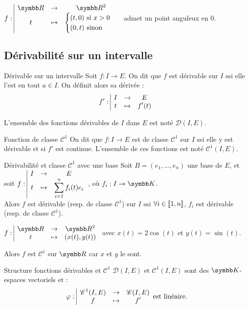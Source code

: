 \begin{exemple}
    $\fonction f \R {\R^2} t {\begin{cases} (t, 0)~\text{si}~x > 0\\(0,t)~\text{sinon}\end{cases}}$ admet un point anguleux en $0$.
\end{exemple}

\subsection{Dérivabilité sur un intervalle}

\begin{definition}{Dérivable sur un intervalle}{}
    Soit $f : I \to E$. On dit que $f$ est dérivable sur $I$ ssi elle l'est en tout $a \in I$. 
    On définit alors sa dérivée :
    \[f': \space \begin{array}{|ccc} \displaystyle I & \to & \displaystyle E \\ \displaystyle t & \mapsto & \displaystyle f'(t) \end{array}\] 

    L'ensemble des fonctions dérivables de $I$ dans $E$ est noté $\mathscr D(I, E)$.
\end{definition}

\begin{definition}{Fonction de classe $\mathscr C^1$}{}
    On dit que $f : I \to E$ est de classe $\mathscr C^1$ sur $I$ ssi 
    elle y est dérivable et si $f'$ est continue.
    L'ensemble de ces fonctions est noté $\mathscr C^1(I, E)$.
\end{definition}

\begin{proposition}{Dérivabilité et classe $\mathscr C^1$ avec une base }{}
    Soit $B = (e_1, \ldots, e_n)$ une base de $E$, et soit
    $\displaystyle f: \space \begin{array}{|ccc} \displaystyle I & \to & \displaystyle E \\ \displaystyle t & \mapsto & \displaystyle \sum_{i=1}^n f_i(t)e_i \end{array}$, où $f_i : I \to \K$. \\

    Alors $f$ est dérivable (resp. de classe $\mathscr C^1$) sur $I$ ssi
    $\forall i \in [\![1, n]\!]$, $f_i$ est dérivable (resp. de classe $\mathscr C^1$).
\end{proposition}

\begin{exemple}
    $\fonction{f}{\R}{\R^2}{t}{(x(t), y(t))}$ avec $x(t) = 2 \cos(t)$ et $y(t) = \sin(t)$.

    Alors $f$ est $\mathscr C^1$ sur $\R$ car $x$ et $y$ le sont.
\end{exemple}


\begin{proposition}{Structure fonctions dérivables et $\mathscr C^1$}{}
    $\mathscr D(I, E)$ et $\mathscr C^1(I, E)$ sont des $\K$-espaces vectoriels et :
    \[\varphi: \space \begin{array}{|ccc} \displaystyle \mathscr C^1(I, E) & \to & \displaystyle \mathscr C(I, E) \\ \displaystyle f & \mapsto & \displaystyle f' \end{array} \text{est linéaire.}\] 
\end{proposition}

